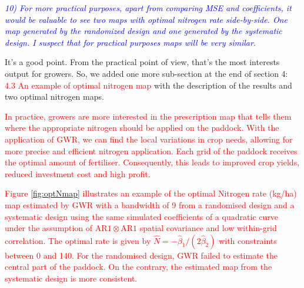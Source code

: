 \documentclass[a4paper]{article}   	%
\newcommand{\AR}{\mathrm{AR1}}
\newcommand{\revision}[1]{\textcolor{red}{#1}}
\newcommand{\reviewer}[1]{\textcolor{blue}{\textit{#1}}}
\begin{document}
\reviewer{10) For more practical purposes, apart from comparing MSE and coefficients, it would be valuable to see two maps with optimal nitrogen rate side-by-side. One map generated by the randomized design and one generated by the systematic design. I suspect that for practical purposes maps will be very similar.}

It's a good point. From the practical point of view, that's the most interests output for growers. So, we added one more sub-section at the end of section 4: 
\revision{4.3 An example of optimal nitrogen map} with the description of the results and two optimal nitrogen maps. 


\revision{In practice, growers are more interested in the prescription map that tells them where the appropriate nitrogen should be applied on the paddock. With the application of GWR, we can find the local variations in crop needs, allowing for more precise and efficient nitrogen application. Each grid of the paddock receives the optimal amount of fertiliser. Consequently, this leads to improved crop yields, reduced investment cost and high profit.}

\revision{Figure \ref{fig:optNmap} illustrates an example of the optimal Nitrogen rate (kg/ha) map estimated by GWR with a bandwidth of 9 from a randomised design and a systematic design using the same simulated coefficients of a quadratic curve under the assumption of $\AR\otimes\AR$ spatial covariance and low within-grid correlation. The optimal rate is given by $\hat{N} = -\hat{\beta}_1/(2\hat{\beta}_2)$ with constraints between 0 and 140. For the randomised design, GWR failed to estimate the central part of the paddock. On the contrary, the estimated map from the systematic design is more consistent.}
\end{document}
